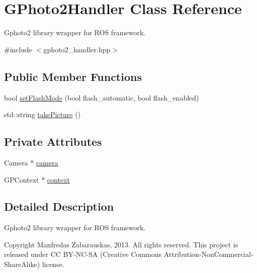 \hypertarget{class_g_photo2_handler}{\section{\-G\-Photo2\-Handler \-Class \-Reference}
\label{class_g_photo2_handler}
}


\-Gphoto2 library wrapper for \-R\-O\-S framework.  




{\ttfamily \#include $<$gphoto2\-\_\-handler.\-hpp$>$}

\subsection*{\-Public \-Member \-Functions}
\begin{DoxyCompactItemize}
\item 
bool \hyperlink{class_g_photo2_handler_a632b2a4d6c607c613a197390aa7d9d3b}{set\-Flash\-Mode} (bool flash\-\_\-automatic, bool flash\-\_\-enabled)
\item 
std\-::string \hyperlink{class_g_photo2_handler_a37b946f44e580b97d2f9f72c4b18b477}{take\-Picture} ()
\end{DoxyCompactItemize}
\subsection*{\-Private \-Attributes}
\begin{DoxyCompactItemize}
\item 
\-Camera $\ast$ \hyperlink{class_g_photo2_handler_a44fe83e77887a8dca5532744966e705e}{camera}
\item 
\-G\-P\-Context $\ast$ \hyperlink{class_g_photo2_handler_a8f33776112786bccecb6825476ee7789}{context}
\end{DoxyCompactItemize}


\subsection{\-Detailed \-Description}
\-Gphoto2 library wrapper for \-R\-O\-S framework. 

\begin{DoxyCopyright}{\-Copyright}
\-Manfredas \-Zabarauskas, 2013. \-All rights reserved. \-This project is released under \-C\-C \-B\-Y-\/\-N\-C-\/\-S\-A (\-Creative \-Commons \-Attribution-\/\-Non\-Commercial-\/\-Share\-Alike) license. 
\end{DoxyCopyright}


